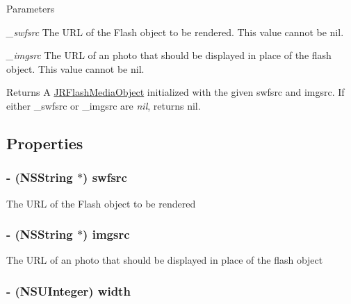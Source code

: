 \begin{DoxyParams}{Parameters}
\item[{\em \_\-swfsrc}]The URL of the Flash object to be rendered. This value cannot be {\ttfamily nil}.\item[{\em \_\-imgsrc}]The URL of an photo that should be displayed in place of the flash object. This value cannot be {\ttfamily nil}.\end{DoxyParams}
\begin{DoxyReturn}{Returns}
A \hyperlink{interface_j_r_flash_media_object}{JRFlashMediaObject} initialized with the given swfsrc and imgsrc. If either {\ttfamily \_\-swfsrc} or {\ttfamily \_\-imgsrc} are {\itshape nil\/}, returns {\ttfamily nil}. 
\end{DoxyReturn}


\subsection{Properties}
\hypertarget{interface_j_r_flash_media_object_a5a79b3d8071ac0286b3ee60e9e0138d0}{
\subsubsection[{swfsrc}]{\setlength{\rightskip}{0pt plus 5cm}-\/ (NSString $\ast$) swfsrc}}
\label{interface_j_r_flash_media_object_a5a79b3d8071ac0286b3ee60e9e0138d0}
The URL of the Flash object to be rendered \hypertarget{interface_j_r_flash_media_object_a5a26cacd216012b37900445a8161ac56}{
\subsubsection[{imgsrc}]{\setlength{\rightskip}{0pt plus 5cm}-\/ (NSString $\ast$) imgsrc}}
\label{interface_j_r_flash_media_object_a5a26cacd216012b37900445a8161ac56}
The URL of an photo that should be displayed in place of the flash object \hypertarget{interface_j_r_flash_media_object_aaeb77e697438b7aa6e44f52bea0ed9c2}{
\subsubsection[{width}]{\setlength{\rightskip}{0pt plus 5cm}-\/ (NSUInteger) width}}
